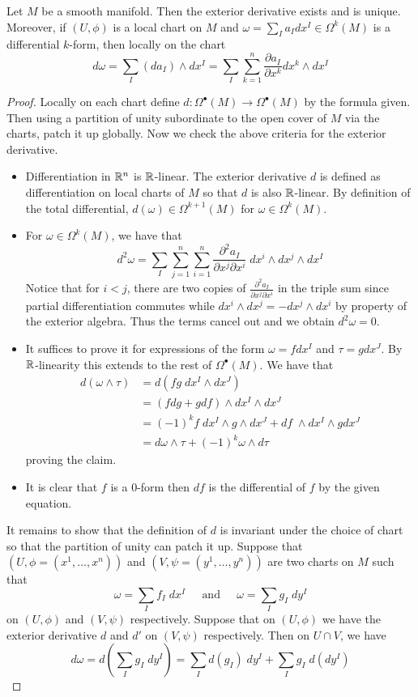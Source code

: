 \documentclass[a4paper]{article}
\begin{document}
\begin{prp}{}{} Let $M$ be a smooth manifold. Then the exterior derivative exists and is unique. Moreover, if $(U,\phi)$ is a local chart on $M$ and $\omega=\sum_Ia_Idx^I\in\Omega^k(M)$ is a differential $k$-form, then locally on the chart $$d\omega=\sum_I(da_I)\wedge dx^I=\sum_I\sum_{k=1}^n\frac{\partial a_I}{\partial x^k}dx^k\wedge dx^I$$ \tcbline
\begin{proof}
Locally on each chart define $d:\Omega^\bullet(M)\to\Omega^\bullet(M)$ by the formula given. Then using a partition of unity subordinate to the open cover of $M$ via the charts, patch it up globally. Now we check the above criteria for the exterior derivative. 

\begin{itemize}
\item Differentiation in $\mathbb{R}^n$ is $\mathbb{R}$-linear. The exterior derivative $d$ is defined as differentiation on local charts of $M$ so that $d$ is also $\mathbb{R}$-linear. By definition of the total differential, $d(\omega)\in\Omega^{k+1}(M)$ for $\omega\in\Omega^k(M)$. 
\item For $\omega\in\Omega^k(M)$, we have that $$d^2\omega=\sum_I\sum_{j=1}^n\sum_{i=1}^n\frac{\partial^2 a_I}{\partial x^j\partial x^i}\;dx^i\wedge dx^j\wedge dx^I$$ Notice that for $i<j$, there are two copies of $\frac{\partial^2 a_I}{\partial x^j\partial x^i}$ in the triple sum since partial differentiation commutes while $dx^i\wedge dx^j=-dx^j\wedge dx^i$ by property of the exterior algebra. Thus the terms cancel out and we obtain $d^2\omega=0$. 
\item It suffices to prove it for expressions of the form $\omega=fdx^I$ and $\tau=gdx^J$. By $\mathbb{R}$-linearity this extends to the rest of $\Omega^\bullet(M)$. We have that 
\begin{align*}
d(\omega\wedge\tau)&=d(fg\;dx^I\wedge dx^J)\\
&=(fdg+gdf)\wedge dx^I\wedge dx^J\\
&=(-1)^kf\;dx^I\wedge g\wedge dx^J+df\;\wedge dx^I\wedge gdx^J\\
&=d\omega\wedge\tau+(-1)^k\omega\wedge d\tau
\end{align*}
proving the claim. 
\item It is clear that $f$ is a $0$-form then $df$ is the differential of $f$ by the given equation. 
\end{itemize}
It remains to show that the definition of $d$ is invariant under the choice of chart so that the partition of unity can patch it up. Suppose that $(U,\phi=(x^1,\dots,x^n))$ and $(V,\psi=(y^1,\dots,y^n))$ are two charts on $M$ such that $$\omega=\sum_If_I\;dx^I\;\;\;\;\text{ and }\;\;\;\;\omega=\sum_Ig_I\;dy^I$$ on $(U,\phi)$ and $(V,\psi)$ respectively. Suppose that on $(U,\phi)$ we have the exterior derivative $d$ and $d'$ on $(V,\psi)$ respectively. Then on $U\cap V$, we have $$d\omega=d\left(\sum_Ig_I\;dy^I\right)=\sum_Id(g_I)\;dy^I+\sum_Ig_I\;d(dy^I)$$

\end{proof}
\end{prp}
\end{document}

